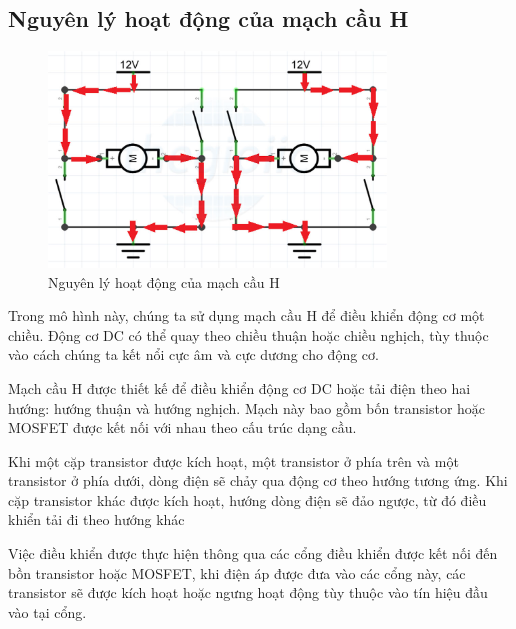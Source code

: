         \subsection{Nguyên lý hoạt động của mạch cầu H}
        \begin{figure}[H]
            \centering
            \includegraphics[width=0.8\textwidth]{pictures/cauhwork.png}
            \caption{Nguyên lý hoạt động của mạch cầu H}
            \label{fig:hbridge}
        \end{figure}
        \hspace*{0.6cm}Trong mô hình này, chúng ta sử dụng mạch cầu H để điều khiển động cơ một chiều. Động cơ DC có thể quay theo chiều thuận hoặc chiều nghịch, tùy thuộc vào cách chúng ta kết nổi cực âm và cực dương cho động cơ.

        Mạch cầu H được thiết kế để điều khiển động cơ DC hoặc tải điện theo hai hướng: hướng thuận và hướng nghịch. Mạch này bao gồm bốn transistor hoặc MOSFET được kết nối với nhau theo cấu trúc dạng cầu.

        Khi một cặp transistor được kích hoạt, một transistor ở phía trên và một transistor ở phía dưới, dòng điện sẽ chảy qua động cơ theo hướng tương ứng. Khi cặp transistor khác được kích hoạt, hướng dòng điện sẽ đảo ngược, từ đó điều khiển tải đi theo hướng khác

        Việc điều khiển được thực hiện thông qua các cổng điều khiển được kết nối đến bồn transistor hoặc MOSFET, khi điện áp được đưa vào các cổng này, các transistor sẽ được kích hoạt hoặc ngưng hoạt động tùy thuộc vào tín hiệu đầu vào tại cổng.
        \cleardoublepage
